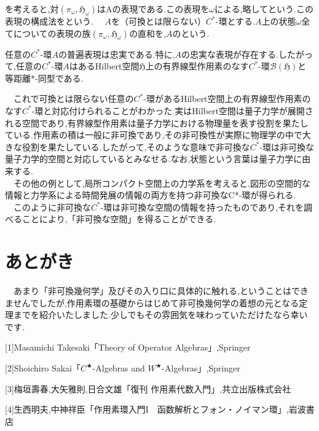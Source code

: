 を考えると,対$\left(\pi_{\omega},\mathfrak{H}_{\omega}\right)$はAの表現である.この表現を$\omega$による,略してという.この表現の構成法をという.
　$A$を（可換とは限らない）$C^*$-環とする.$A$上の状態$\omega$全てについての表現の族$\left(\pi_{\omega},\mathfrak{H}_{\omega}\right)$の直和を,$A$のという.
\begin{theo}
任意の$C^*$-環$A$の普遍表現は忠実である.特に,$A$の忠実な表現が存在する.したがって,任意の$C^*$-環$A$はある{\rm Hilbert}空間$\mathfrak{H}$上の有界線型作用素のなす$C^*$-環$\mathcal{B}\left(\mathfrak{H}\right)$と等距離*-同型である.
\end{theo}
　これで可換とは限らない任意の$C^*$-環があるHilbert空間上の有界線型作用素のなす$C^*$-環と対応付けられることがわかった.実はHilbert空間は量子力学が展開される空間であり,有界線型作用素は量子力学における物理量を表す役割を果たしている.作用素の積は一般に非可換であり,その非可換性が実際に物理学の中で大きな役割を果たしている.したがって,そのような意味で非可換な$C^*$-環は非可換な量子力学的空間と対応しているとみなせる.なお,状態という言葉は量子力学に由来する.\\
　その他の例として,局所コンパクト空間上の力学系を考えると,図形の空間的な情報と力学系による時間発展の情報の両方を持つ非可換なC*-環が得られる.\\
　このように非可換な$C^*$-環は非可換な空間の情報を持ったものであり,それを調べることにより,「非可換な空間」を得ることができる.
\section{あとがき}
　あまり「非可換幾何学」及びその入り口に具体的に触れる,ということはできませんでしたが,作用素環の基礎からはじめて非可換幾何学の着想の元となる定理までを紹介いたしました.少しでもその雰囲気を味わっていただけたなら幸いです.

\begin{description}
\item{[1]}Masamichi Takesaki「Theory of Operator Algebras」,Springer
\item{[2]}Shoichiro Sakai「$C^★$-Algebras and $W^★$-Algebras」,Springer
\item{[3]}梅垣壽春,大矢雅則,日合文雄「復刊 作用素代数入門」,共立出版株式会社
\item{[4]}生西明夫,中神祥臣「作用素環入門I　函数解析とフォン・ノイマン環」,岩波書店
\end{description}
